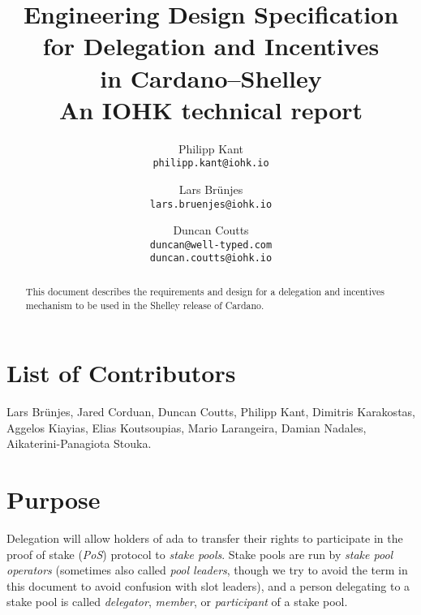 \documentclass[11pt,a4paper]{article}
\begin{document}
\title{Engineering Design Specification \\
  for Delegation and Incentives \\
  in Cardano--Shelley \\
  {\large \sc An IOHK technical report}}

\author{Philipp Kant   \\ {\small \texttt{philipp.kant@iohk.io}} \\
   \and Lars Br\"unjes \\ {\small \texttt{lars.bruenjes@iohk.io}} \\
   \and Duncan Coutts  \\ {\small \texttt{duncan@well-typed.com}} \\
                          {\small \texttt{duncan.coutts@iohk.io}}}
\maketitle

\begin{abstract}
This document describes the requirements and design for a delegation and
incentives mechanism to be used in the Shelley release of Cardano.
\end{abstract}

\section*{List of Contributors}
\label{acknowledgements}

Lars Br\"unjes, Jared Corduan, Duncan Coutts, Philipp Kant,
Dimitris Karakostas, Aggelos Kiayias, Elias Koutsoupias, Mario
Larangeira, Damian Nadales, Aikaterini-Panagiota Stouka.

\tableofcontents
\listoffigures
\listoftodos

\section{Purpose}
\label{purpose}

Delegation will allow holders of ada to transfer their rights to participate in
the proof of stake (\emph{PoS}) protocol to \emph{stake pools}. Stake pools are
run by \emph{stake pool operators} (sometimes also called \emph{pool leaders},
though we try to avoid the term in this document to avoid confusion with slot
leaders), and a person delegating to a stake pool is called \emph{delegator},
\emph{member}, or \emph{participant} of a stake pool.
\end{document}
